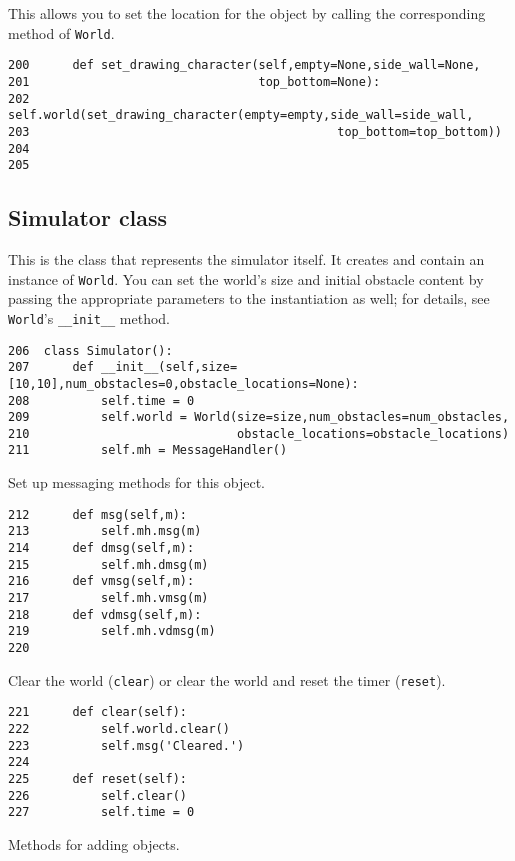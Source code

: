 \documentclass[11pt]{tufte-handout}
\begin{document}
This allows you to set the location for the object by calling the corresponding method of \texttt{World}.

\begin{verbatim}
200      def set_drawing_character(self,empty=None,side_wall=None,
201                                top_bottom=None):
202          self.world(set_drawing_character(empty=empty,side_wall=side_wall,
203                                           top_bottom=top_bottom))
204  
205  
\end{verbatim}

\subsection{Simulator class}
\label{sec:org78ea149}

This is the class that represents the simulator itself.  It creates and contain an instance of \texttt{World}.  You can set the world's size and initial  obstacle content by passing the appropriate parameters to the instantiation as well; for details, see \texttt{World}'s \texttt{\_\_init\_\_} method.

\begin{verbatim}
206  class Simulator():
207      def __init__(self,size=[10,10],num_obstacles=0,obstacle_locations=None):
208          self.time = 0
209          self.world = World(size=size,num_obstacles=num_obstacles,
210                             obstacle_locations=obstacle_locations)
211          self.mh = MessageHandler()
\end{verbatim}

Set up messaging methods for this object.
\begin{verbatim}
212      def msg(self,m):
213          self.mh.msg(m)
214      def dmsg(self,m):
215          self.mh.dmsg(m)
216      def vmsg(self,m):
217          self.mh.vmsg(m)
218      def vdmsg(self,m):
219          self.mh.vdmsg(m)
220  
\end{verbatim}

Clear the world (\texttt{clear}) or clear the world  and reset the timer (\texttt{reset}).

\begin{verbatim}
221      def clear(self):
222          self.world.clear()
223          self.msg('Cleared.')
224  
225      def reset(self):
226          self.clear()
227          self.time = 0
\end{verbatim}

Methods for adding objects.  
\end{document}
